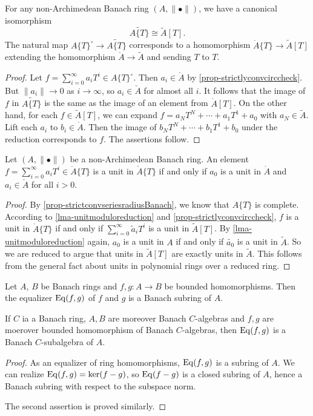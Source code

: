 \begin{corollary}\label{cor-reductionstrictlyconv}
    For any non-Archimedean Banach ring $(A,\|\bullet\|)$, we have a canonical isomorphism
    \[
        \widetilde{A\{T\}}\cong \tilde{A}[T].
    \]
    The natural map ${A\{T\}}^{\circ}\rightarrow \widetilde{A\{T\}}$ corresponds to a homomorphism $\mathring{A}\{T\}\rightarrow \tilde{A}[T]$ extending the homomorphism $\mathring{A}\rightarrow \tilde{A}$ and sending $T$ to $T$.
\end{corollary}
\begin{proof}
    Let $f=\sum_{i=0}^{\infty}a_i T^i\in {A\{T\}}^{\circ}$. 
    Then $a_i\in \mathring{A}$ by \cref{prop-strictlyconvcirccheck}. But $\|a_i\|\to 0$ as $i\to\infty$, so $a_i\in \check{A}$ for almost all $i$. It follows that the image of $f$ in $\widetilde{A\{T\}}$ is the same as the image of an element from $\mathring{A}[T]$. On the other hand, for each $f\in \tilde{A}[T]$, we can expand $f=a_NT^N+\cdots+a_1T^1+a_0$ with $a_N\in \tilde{A}$. Lift each $a_i$ to $b_i\in \mathring{A}$. Then the image of $b_NT^N+\cdots+b_1T^1+b_0$ under the reduction corresponds to $f$. The assertions follow.
\end{proof}

\begin{corollary}\label{cor-unitsstrictlyconv}
    Let $(A,\|\bullet\|)$ be a non-Archimedean Banach ring. An element $f=\sum_{i=0}^{\infty}a_i T^i\in \mathring{A}\{T\}$ is a unit in $\mathring{A}\{T\}$ if and only if $a_0$ is a unit in  $\mathring{A}$ and $a_i\in \check{A}$ for all $i>0$.
\end{corollary}
\begin{proof}
By \cref{prop-strictconvseriesradiusBanach}, we know that $A\{T\}$ is complete.
According to \cref{lma-unitmoduloreduction} and \cref{prop-strictlyconvcirccheck}, $f$ is a unit in $\mathring{A}\{T\}$ if and only if $\sum_{i=0}^{\infty} \tilde{a}_i T^i$  is a unit in $\tilde{A}[T]$. By \cref{lma-unitmoduloreduction} again, $a_0$ is a unit in $A$ if and only if $\tilde{a_0}$ is a unit in $\tilde{A}$. So we are reduced to argue that units in $\tilde{A}[T]$ are exactly units in $\tilde{A}$. This follows from the general fact about units in polynomial rings over a reduced ring.
\end{proof}


\begin{lemma}\label{lma-equalizerbanach}
    Let $A$, $B$ be Banach rings and $f,g:A\rightarrow B$ be bounded homomorphisms. Then the equalizer $\mathrm{Eq}(f,g)$ of $f$ and $g$ is a Banach subring of $A$. 
    
    If $C$ ia a Banach ring, $A,B$ are moreover Banach $C$-algebras and $f,g$ are moerover bounded homomorphism of Banach $C$-algebras, then $\mathrm{Eq}(f,g)$ is a Banach $C$-subalgebra of $A$.
\end{lemma}
\begin{proof}
    As an equalizer of ring homomorphisms, $\mathrm{Eq}(f,g)$ is a subring of $A$. We can realize $\mathrm{Eq}(f,g)=\ker (f-g)$, so $\mathrm{Eq}(f-g)$ is a closed subring of $A$, hence a Banach subring with respect to the subspace norm.

    The second assertion is proved similarly.
\end{proof}


